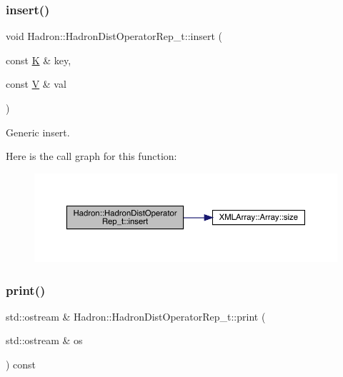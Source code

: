\subsubsection{\texorpdfstring{insert()}{insert()}}
{\footnotesize\ttfamily void Hadron\+::\+Hadron\+Dist\+Operator\+Rep\+\_\+t\+::insert (\begin{DoxyParamCaption}\item[{const \mbox{\hyperlink{classHadron_1_1HadronDistOperatorRep__t_a670c7409bfd80616aeb0159590bcdb6b}{K}} \&}]{key,  }\item[{const \mbox{\hyperlink{classHadron_1_1HadronDistOperatorRep__t_a40f37383ae57b1d0bbf944d698a10382}{V}} \&}]{val }\end{DoxyParamCaption})}



Generic insert. 

Here is the call graph for this function\+:\nopagebreak
\begin{figure}[H]
\begin{center}
\leavevmode
\includegraphics[width=350pt]{dd/de0/classHadron_1_1HadronDistOperatorRep__t_a05856fbd2f2205ddc461685d987713b9_cgraph}
\end{center}
\end{figure}
\mbox{\label{classHadron_1_1HadronDistOperatorRep__t_a800e1844116007d2ca372628f2388ee5}} 
\subsubsection{\texorpdfstring{print()}{print()}}
{\footnotesize\ttfamily std\+::ostream \& Hadron\+::\+Hadron\+Dist\+Operator\+Rep\+\_\+t\+::print (\begin{DoxyParamCaption}\item[{std\+::ostream \&}]{os }\end{DoxyParamCaption}) const}



